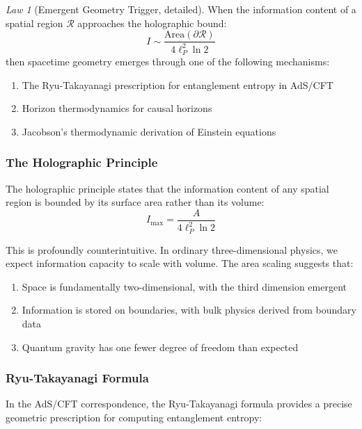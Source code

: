 \documentclass[11pt,a4paper]{article}
\theoremstyle{plain}
\theoremstyle{definition}
\theoremstyle{remark}
\newtheorem{law}{Law}
\begin{document}
\begin{law}[Emergent Geometry Trigger, detailed]
When the information content of a spatial region $\mathcal{R}$ approaches the holographic bound:
\begin{equation}
I \sim \frac{\text{Area}(\partial\mathcal{R})}{4\ell_P^2\ln 2}
\label{eq:holographic_saturation}
\end{equation}
then spacetime geometry emerges through one of the following mechanisms:
\begin{enumerate}
\item The Ryu-Takayanagi prescription for entanglement entropy in AdS/CFT
\item Horizon thermodynamics for causal horizons
\item Jacobson's thermodynamic derivation of Einstein equations
\end{enumerate}
\end{law}

\subsubsection{The Holographic Principle}

The holographic principle \cite{thooft1993dimensional,susskind1995world} states that the information content of any spatial region is bounded by its surface area rather than its volume:
\begin{equation}
I_{\max} = \frac{A}{4\ell_P^2\ln 2}
\end{equation}

This is profoundly counterintuitive. In ordinary three-dimensional physics, we expect information capacity to scale with volume. The area scaling suggests that:

\begin{enumerate}[leftmargin=*]
\item Space is fundamentally two-dimensional, with the third dimension emergent
\item Information is stored on boundaries, with bulk physics derived from boundary data
\item Quantum gravity has one fewer degree of freedom than expected
\end{enumerate}

\subsubsection{Ryu-Takayanagi Formula}

In the AdS/CFT correspondence, the Ryu-Takayanagi formula \cite{ryu2006holographic} provides a precise geometric prescription for computing entanglement entropy:
\end{document}
